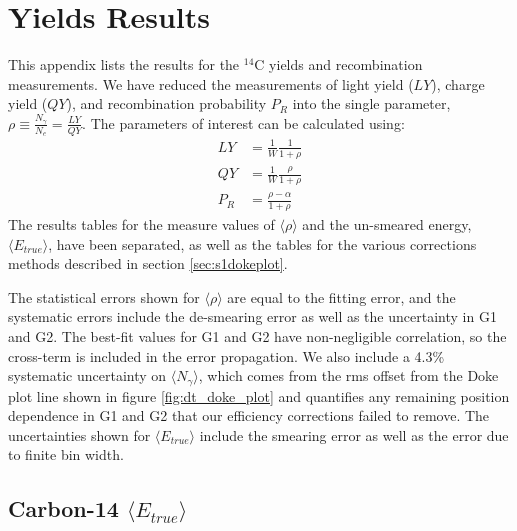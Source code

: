 \chapter{Yields Results}\label{sec:results_tables}
This appendix lists the results for the $^{14}$C yields and recombination measurements. We have reduced the measurements of light yield ($LY$), charge yield ($QY$), and recombination probability $P_R$ into the single parameter, $\rho \equiv \frac{N_{\gamma}}{N_e}=\frac{LY}{QY}$. The parameters of interest can be calculated using:
\begin{equation}\label{eq:translate_rho2}
\begin{split}
LY&=\frac{1}{W}\frac{1}{1+\rho}\\[1em]
QY&=\frac{1}{W}\frac{\rho}{1+\rho}\\[1em]
P_R&=\frac{\rho-\alpha}{1+\rho}
\end{split}
\end{equation}
The results tables for the measure values of $\langle \rho \rangle$ and the un-smeared energy, $\langle E_{true} \rangle$, have been separated, as well as the tables for the various corrections methods described in section \ref{sec:s1dokeplot}.

The statistical errors shown for $\langle \rho \rangle$ are equal to the fitting error, and the systematic errors include the de-smearing error as well as the uncertainty in G1 and G2. The best-fit values for G1 and G2 have non-negligible correlation, so the cross-term is included in the error propagation. We also include a 4.3\% systematic uncertainty on $\langle N_{\gamma} \rangle$, which comes from the rms offset from the Doke plot line shown in figure \ref{fig:dt_doke_plot} and quantifies any remaining position dependence in G1 and G2 that our efficiency corrections failed to remove. The uncertainties shown for $\langle E_{true} \rangle$ include the smearing error as well as the error due to finite bin width.

\section{Carbon-14 $\langle E_{true} \rangle$}


